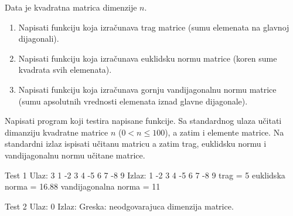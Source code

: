 \begin{Exercise}[label=314]
Data je kvadratna matrica dimenzije $n$.
\begin{enumerate}
\item Napisati funkciju koja izračunava trag matrice (sumu elemenata na glavnoj dijagonali).
\item Napisati funkciju koja izračunava euklidsku normu matrice (koren sume kvadrata svih elemenata).
\item Napisati funkciju koja izračunava gornju vandijagonalnu normu matrice (sumu apsolutnih vrednosti elemenata iznad glavne dijagonale).
\end{enumerate}
Napisati program koji testira napisane funkcije. Sa standardnog
ulaza učitati dimanziju kvadratne matrice $n$
($0 < n \leq 100$), a zatim i elemente matrice. Na standardni izlaz
ispisati učitanu matricu a zatim trag, euklidsku normu i vandijagonalnu normu 
učitane matrice.

\begin{maxitest}
\begin{test}{Test 1}
Ulaz:  3 1 -2 3 4 -5 6 7 -8 9
Izlaz: 1 -2 3 
       4 -5 6 
       7 -8 9
       trag = 5
       euklidska norma = 16.88
       vandijagonalna norma = 11
\end{test}
\end{maxitest}

\begin{maxitest}
\begin{test}{Test 2}
Ulaz:  0
Izlaz: Greska: neodgovarajuca dimenzija matrice. 
\end{test}
\end{maxitest}
\end{Exercise}
\begin{Answer}[ref=314]
\end{Answer}

